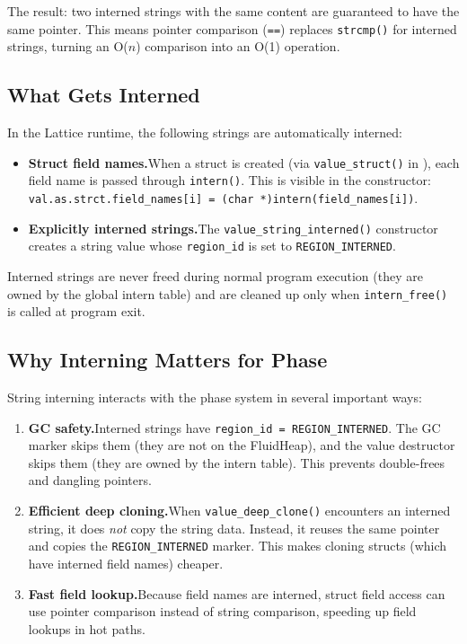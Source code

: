 The result: two interned strings with the same content are guaranteed to have the same pointer.
This means pointer comparison (\lstinline|==|) replaces \lstinline|strcmp()| for interned strings, turning an O($n$) comparison into an O(1) operation.

\subsection{What Gets Interned}

In the Lattice runtime, the following strings are automatically interned:

\begin{itemize}
  \item \textbf{Struct field names.}\quad When a struct is created (via \lstinline|value_struct()| in ), each field name is passed through \lstinline|intern()|.
  This is visible in the constructor: \lstinline|val.as.strct.field_names[i] = (char *)intern(field_names[i])|.

  \item \textbf{Explicitly interned strings.}\quad The \lstinline|value_string_interned()| constructor creates a string value whose \lstinline|region_id| is set to \lstinline|REGION_INTERNED|.
\end{itemize}

Interned strings are never freed during normal program execution (they are owned by the global intern table) and are cleaned up only when \lstinline|intern_free()| is called at program exit.

\subsection{Why Interning Matters for Phase}

String interning interacts with the phase system in several important ways:

\begin{enumerate}
  \item \textbf{GC safety.}\quad Interned strings have \lstinline|region_id = REGION_INTERNED|.
  The GC marker skips them (they are not on the FluidHeap), and the value destructor skips them (they are owned by the intern table).
  This prevents double-frees and dangling pointers.

  \item \textbf{Efficient deep cloning.}\quad When \lstinline|value_deep_clone()| encounters an interned string, it does \emph{not} copy the string data.
  Instead, it reuses the same pointer and copies the \lstinline|REGION_INTERNED| marker.
  This makes cloning structs (which have interned field names) cheaper.

  \item \textbf{Fast field lookup.}\quad Because field names are interned, struct field access can use pointer comparison instead of string comparison, speeding up field lookups in hot paths.
\end{enumerate}

